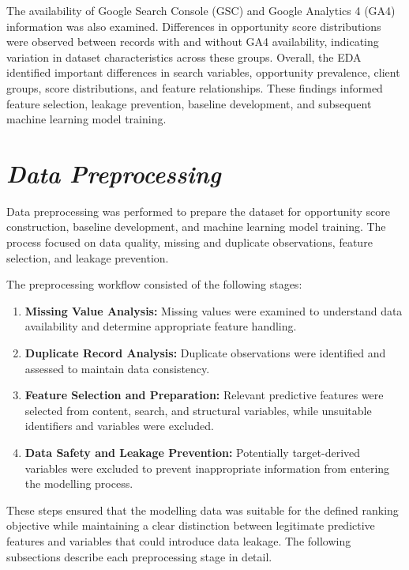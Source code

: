 \documentclass[12pt,a4paper]{report}
\begin{document}
The availability of Google Search Console (GSC) and Google Analytics 4 (GA4) information was also examined. Differences in opportunity score distributions were observed between records with and without GA4 availability, indicating variation in dataset characteristics across these groups. Overall, the EDA identified important differences in search variables, opportunity prevalence, client groups, score distributions, and feature relationships. These findings informed feature selection, leakage prevention, baseline development, and subsequent machine learning model training.

\section{\textit{Data Preprocessing}}
Data preprocessing was performed to prepare the dataset for opportunity score construction, baseline development, and machine learning model training. The process focused on data quality, missing and duplicate observations, feature selection, and leakage prevention.

The preprocessing workflow consisted of the following stages:

\begin{enumerate}
    \item \textbf{Missing Value Analysis:} Missing values were examined to understand data availability and determine appropriate feature handling.

    \item \textbf{Duplicate Record Analysis:} Duplicate observations were identified and assessed to maintain data consistency.

    \item \textbf{Feature Selection and Preparation:} Relevant predictive features were selected from content, search, and structural variables, while unsuitable identifiers and variables were excluded.

    \item \textbf{Data Safety and Leakage Prevention:} Potentially target-derived variables were excluded to prevent inappropriate information from entering the modelling process.
\end{enumerate}

These steps ensured that the modelling data was suitable for the defined ranking objective while maintaining a clear distinction between legitimate predictive features and variables that could introduce data leakage. The following subsections describe each preprocessing stage in detail.
\end{document}
